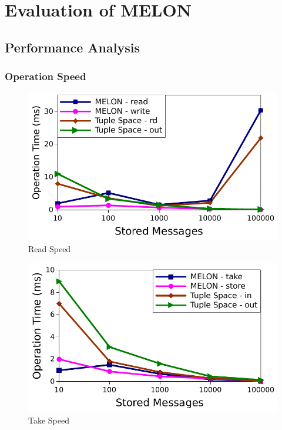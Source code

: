 \chapter{Evaluation of MELON}\label{chapter:evaluation}

\section{Performance Analysis}

\subsection{Operation Speed}

\begin{figure}
\centering
\includegraphics[width = \linewidth, clip, trim = 0px 0px 0px 0px]{figures/read_speed.pdf}
\caption{Read Speed}
\label{fig:readspeed}
\end{figure}

\begin{figure}
\centering
\includegraphics[width = \linewidth, clip, trim = 0px 0px 0px 0px]{figures/in_speed.pdf}
\caption{Take Speed}
\label{fig:takespeed}
\end{figure}

